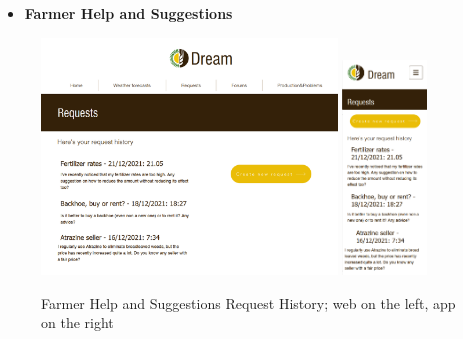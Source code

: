 \documentclass{article}
\begin{document}
    
    \begin{itemize}
        \item \textbf{Farmer Help and Suggestions}
    \end{itemize}
        \begin{figure} [h]
            \centering
            \includegraphics[width=0.7\textwidth]{images/UserInterfaces/Farmer/HelpAndSuggestions/RequestHistoryWeb.png}
            \quad
            \includegraphics[width=0.2\textwidth]{images/UserInterfaces/Farmer/HelpAndSuggestions/RequestHistoryApp.png}
            \quad
            \caption{\label{fig:farmerHelpHistory}Farmer Help and Suggestions Request History; web on the left, app on the right}
        \end{figure}
        \newpage
\end{document}
